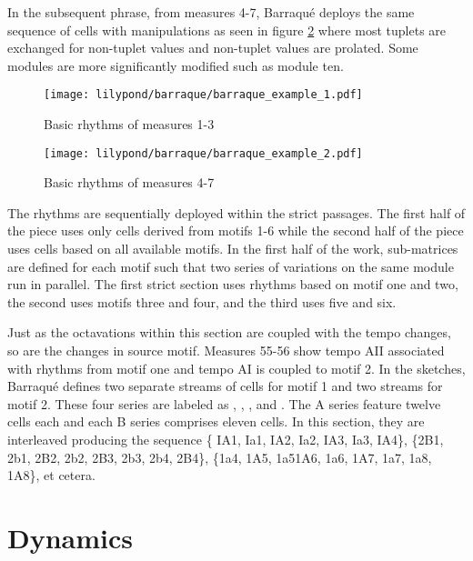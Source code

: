 In the subsequent phrase, from measures 4-7, Barraqué deploys the same sequence of cells with manipulations as seen in figure \ref{fig:rhythm-mutation-2} where most tuplets are exchanged for non-tuplet values and non-tuplet values are prolated. Some modules are more significantly modified such as module ten.

\begin{figure}[H]
    \texttt{[image: lilypond/barraque/barraque\_example\_1.pdf]}
    \caption{Basic rhythms of measures 1-3}
    \label{fig:rhythm-mutation-1}
\end{figure}

\begin{figure}[H]
    \texttt{[image: lilypond/barraque/barraque\_example\_2.pdf]}
    \caption{Basic rhythms of measures 4-7}
    \label{fig:rhythm-mutation-2}
\end{figure}

The rhythms are sequentially deployed within the strict passages. The first half of the piece uses only cells derived from motifs 1-6 while the second half of the piece uses cells based on all available motifs. In the first half of the work, sub-matrices are defined for each motif such that two series of variations on the same module run in parallel. The first strict section uses rhythms based on motif one and two, the second uses motifs three and four, and the third uses five and six.

Just as the octavations within this section are coupled with the tempo changes, so are the changes in source motif. Measures 55-56 show tempo AII associated with rhythms from motif one and tempo AI is coupled to motif 2. In the sketches, Barraqué defines two separate streams of cells for motif 1 and two streams for motif 2. These four series are labeled as , , , and . The A series feature twelve cells each and each B series comprises eleven cells. In this section, they are interleaved producing the sequence \{ IA1, Ia1, IA2, Ia2, IA3, Ia3, IA4\}, \{2B1, 2b1, 2B2, 2b2, 2B3, 2b3, 2b4, 2B4\}, \{1a4, 1A5, 1a51A6, 1a6, 1A7, 1a7, 1a8, 1A8\}, et cetera. 

\section{Dynamics}

